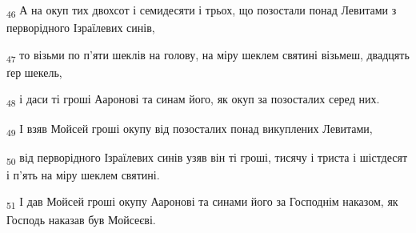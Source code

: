 \begin{tcolorbox}
\textsubscript{46} А на окуп тих двохсот і семидесяти і трьох, що позостали понад Левитами з перворідного Ізраїлевих синів,
\end{tcolorbox}
\begin{tcolorbox}
\textsubscript{47} то візьми по п'яти шеклів на голову, на міру шеклем святині візьмеш, двадцять ґер шекель,
\end{tcolorbox}
\begin{tcolorbox}
\textsubscript{48} і даси ті гроші Ааронові та синам його, як окуп за позосталих серед них.
\end{tcolorbox}
\begin{tcolorbox}
\textsubscript{49} І взяв Мойсей гроші окупу від позосталих понад викуплених Левитами,
\end{tcolorbox}
\begin{tcolorbox}
\textsubscript{50} від перворідного Ізраїлевих синів узяв він ті гроші, тисячу і триста і шістдесят і п'ять на міру шеклем святині.
\end{tcolorbox}
\begin{tcolorbox}
\textsubscript{51} І дав Мойсей гроші окупу Ааронові та синами його за Господнім наказом, як Господь наказав був Мойсеєві.
\end{tcolorbox}
